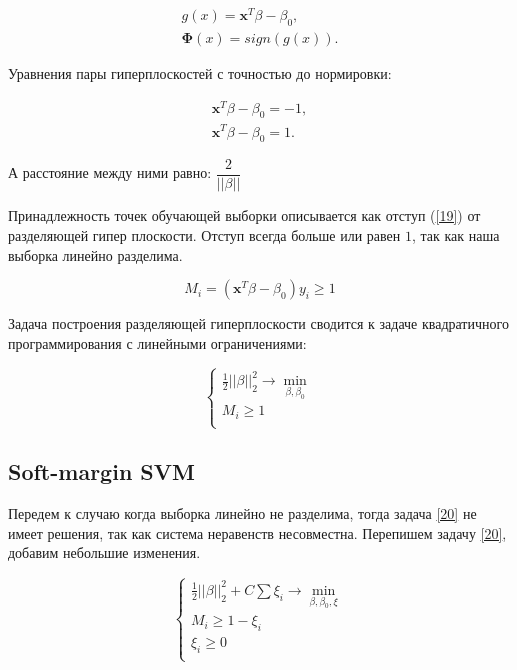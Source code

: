 \documentclass[11pt, oneside]{article}   	%
\begin{document}
\begin{equation}
	\begin{split}
	 g(x) =  \bm{x}^T \beta - \beta_0, \\
	 \bm{\Phi}(x) =  sign ( g(x) ).
	\end{split}
	\label{17}
\end{equation}

Уравнения пары гиперплоскостей с точностью до нормировки:

\begin{equation}
	\begin{split}
		\bm{x}^T \beta - \beta_0 = -1, \\
		\bm{x}^T \beta - \beta_0 = 1.
	\end{split}
	\label{18}
\end{equation}

А расстояние между ними равно: $\dfrac{2}{||\beta||}$

Принадлежность точек обучающей выборки описывается как отступ (\ref{19}) от разделяющей гипер плоскости. Отступ всегда больше или равен $1$, так как наша выборка линейно разделима.

\begin{equation}
	M_i = (\bm{x}^T \beta - \beta_0)y_i \geqslant 1
	\label{19}
\end{equation}

Задача построения разделяющей гиперплоскости сводится к задаче квадратичного программирования с линейными ограничениями:

\begin{equation}
	\begin{cases}
		\frac{1}{2}||\beta||_2^2\rightarrow \min\limits_{\beta,\beta_0} \\
		M_i  \geqslant 1 \\
	\end{cases}
	\label{20}
\end{equation}

\subsection{Soft-margin SVM}

Передем к случаю когда выборка линейно не разделима, тогда задача \ref{20} не имеет решения, так как система неравенств несовместна. Перепишем задачу \ref{20}, добавим небольшие изменения.

\begin{equation}
	\begin{cases}
		\frac{1}{2}||\beta||_2^2 + C \sum \xi_i \rightarrow \min\limits_{\beta,\beta_0, \xi} \\
		M_i \geqslant 1 - \xi_i \\
		\xi_i \geqslant 0 \\
	\end{cases}
	\label{21}
\end{equation}
\end{document}
